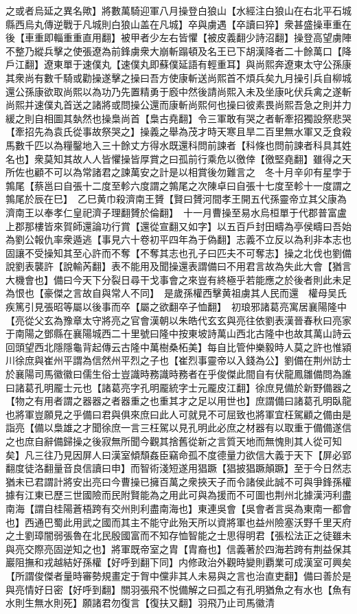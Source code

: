 之或者烏延之異名歟】將數萬騎迎軍八月操登白狼山【水經注白狼山在右北平石城縣西烏丸傳逆戰于凡城則白狼山盖在凡城】卒與虜遇【卒讀曰猝】衆甚盛操車重在後【車重即輜重重直用翻】被甲者少左右皆懼【被皮義翻少詩沼翻】操登高望虜陣不整乃縱兵擊之使張遼為前鋒虜衆大崩斬蹋頓及名王已下胡漢降者二十餘萬口【降戶江翻】遼東單于速僕丸【速僕丸即蘇僕延語有輕重耳】與尚熙奔遼東太守公孫康其衆尚有數千騎或勸操遂擊之操曰吾方使康斬送尚熙首不煩兵矣九月操引兵自柳城還公孫康欲取尚熙以為功乃先置精勇于廏中然後請尚熙入未及坐康叱伏兵禽之遂斬尚熙并速僕丸首送之諸將或問操公還而康斬尚熙何也操曰彼素畏尚熙吾急之則并力緩之則自相圖其埶然也操梟尚首【梟古堯翻】令三軍敢有哭之者斬牽招獨設祭悲哭【牽招先為袁氏從事故祭哭之】操義之舉為茂才時天寒且旱二百里無水軍又乏食殺馬數千匹以為糧鑿地入三十餘丈方得水既還科問前諫者【科條也問前諫者科具其姓名也】衆莫知其故人人皆懼操皆厚賞之曰孤前行乘危以徼倖【徼堅堯翻】雖得之天所佐也顧不可以為常諸君之諫萬安之計是以相賞後勿難言之　冬十月辛卯有星孛于鶉尾【蔡邕曰自張十二度至軫六度謂之鶉尾之次陳卓曰自張十七度至軫十一度謂之鶉尾於辰在巳】　乙巳黄巾殺濟南王贇【賢曰贇河間孝王開五代孫靈帝立其父康為濟南王以奉孝仁皇祀濟子理翻贇於倫翻】　十一月曹操至易水烏桓單于代郡普富盧上郡那樓皆來賀師還論功行賞【還從宣翻又如字】以五百戶封田疇為亭侯疇曰吾始為劉公報仇率衆遁逃【事見六十卷初平四年為于偽翻】志義不立反以為利非本志也固讓不受操知其至心許而不奪【不奪其志也孔子曰匹夫不可奪志】操之北伐也劉備說劉表襲許【說輸芮翻】表不能用及聞操還表謂備曰不用君言故為失此大會【猶言大機會也】備曰今天下分裂日尋干戈事會之來豈有終極乎若能應之於後者則此未足為恨也【豪傑之言故自與常人不同】　是歲孫權西擊黄祖虜其人民而還　權母吴氏疾篤引見張昭等屬以後事而卒【屬之欲翻卒子恤翻】　初琅邪諸葛亮寓居襄陽隆中【亮從父玄為豫章太守將亮之官會漢朝以朱皓代玄玄與亮往依劉表漢晉春秋曰亮家于南陽之鄧縣在襄陽城西二十里號曰隆中按東坡詩萬山西北古隆中也故其萬山詩云回頭望西北隱隱龜背起傳云古隆中萬樹桑柘美】每自比管仲樂毅時人莫之許也惟潁川徐庶與崔州平謂為信然州平烈之子也【崔烈事靈帝以入錢為公】劉備在荆州訪士於襄陽司馬徽徽曰儒生俗士豈識時務識時務者在乎俊傑此間自有伏龍鳳雛備問為誰曰諸葛孔明龎士元也【諸葛亮字孔明龎統字士元龎皮江翻】徐庶見備於新野備器之【物之有用者謂之器器之者器重之也重其才之足以用世也】庶謂備曰諸葛孔明臥龍也將軍豈願見之乎備曰君與俱來庶曰此人可就見不可屈致也將軍宜枉駕顧之備由是詣亮【備以梟雄之才聞徐庶一言三枉駕以見孔明此必庶之材器有以取重于備備遂信之也庶自辭備歸操之後寂無所聞今觀其捨舊從新之言質天地而無愧則其人從可知矣】凡三往乃見因屏人曰漢室傾頹姦臣竊命孤不度德量力欲信大義于天下【屏必郢翻度徒洛翻量音良信讀曰申】而智術淺短遂用猖蹶【猖披猖蹶顛蹶】至于今日然志猶未已君謂計將安出亮曰今曹操已擁百萬之衆挾天子而令諸侯此誠不可與爭鋒孫權據有江東已歷三世國險而民附賢能為之用此可與為援而不可圖也荆州北據漢沔利盡南海【謂自桂陽蒼梧跨有交州則利盡南海也】東連吳會【吳會者言吳為東南一都會也】西通巴蜀此用武之國而其主不能守此殆天所以資將軍也益州險塞沃野千里天府之土劉璋闇弱張魯在北民殷國富而不知存恤智能之士思得明君【張松法正之徒雖未與亮交際亮固逆知之也】將軍既帝室之胄【胄裔也】信義著於四海若跨有荆益保其巖阻撫和戎越結好孫權【好呼到翻下同】内修政治外觀時變則覇業可成漢室可興矣【所謂俊傑者量時審勢規畫定于胷中儻非其人未易與之言也治直吏翻】備曰善於是與亮情好日密【好呼到翻】關羽張飛不悦備解之曰孤之有孔明猶魚之有水也【魚有水則生無水則死】願諸君勿復言【復扶又翻】羽飛乃止司馬徽清